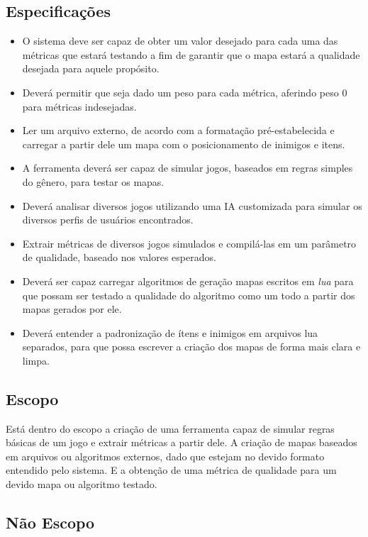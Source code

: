 \subsection{Especificações}
\begin{itemize}
\item O sistema deve ser capaz de obter um valor desejado para cada uma das métricas que estará testando a fim de garantir que o mapa estará a qualidade desejada para aquele propósito.
\item Deverá permitir que seja dado um peso para cada métrica, aferindo peso 0 para métricas indesejadas.
\item Ler um arquivo externo, de acordo com a formatação pré-estabelecida e carregar a partir dele um mapa com o posicionamento de inimigos e itens.
\item A ferramenta deverá ser capaz de simular jogos, baseados em regras simples do gênero, para testar os mapas.
\item Deverá analisar diversos jogos utilizando uma IA customizada para simular os diversos perfis de usuários encontrados.
\item Extrair métricas de diversos jogos simulados e compilá-las em um parâmetro de qualidade, baseado nos valores esperados.
\item Deverá ser capaz carregar algoritmos de geração mapas escritos em \textit{lua} para que possam ser testado a qualidade do algoritmo como um todo  a partir dos mapas gerados por ele.
\item Deverá entender a padronização de ítens e inimigos em arquivos lua separados, para que possa escrever a criação dos mapas de forma mais clara e limpa.
\end{itemize}



\subsection{Escopo}

Está dentro do escopo a criação de uma ferramenta capaz de simular regras básicas de um jogo e extrair métricas a partir dele. A criação de mapas baseados em arquivos ou algoritmos externos, dado que estejam no devido formato entendido pelo sistema. E a obtenção de uma métrica de qualidade para um devido mapa ou algoritmo testado.

\subsection{Não Escopo}


